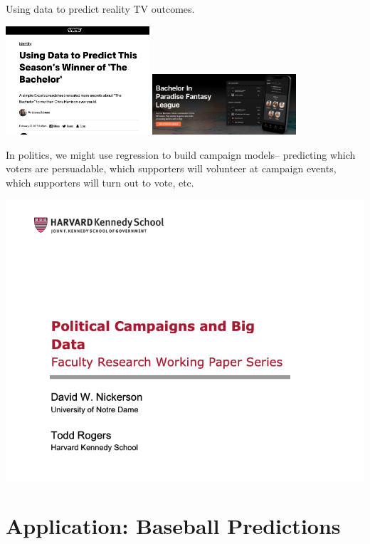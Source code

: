 \documentclass[
  letterpaper,
  DIV=11,
  numbers=noendperiod]{scrreprt}
\begin{document}
Using data to predict reality TV outcomes.

\includegraphics[width=0.4\textwidth,height=\textheight]{images/bach1.png}
\includegraphics[width=0.4\textwidth,height=\textheight]{images/bachinp.png}

In politics, we might use regression to build campaign models--
predicting which voters are persuadable, which supporters will volunteer
at campaign events, which supporters will turn out to vote, etc.

\includegraphics{images/polcampaign.png}

\hypertarget{application-baseball-predictions}{%
\section{Application: Baseball
Predictions}\label{application-baseball-predictions}}
\end{document}
